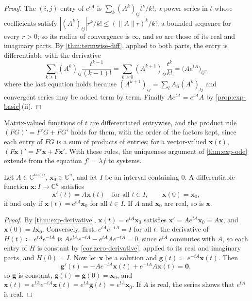 \begin{proof}
The $(i,j)$ entry of $e^{tA}$ is $\sum_k(A^k)_{ij}t^k/k!$, a power series in $t$ whose coefficients satisfy $|(A^k)_{ij}|r^k/k!\le(\|A\|r)^k/k!$, a bounded sequence for every $r>0$; so its radius of convergence is $\infty$, and so are those of its real and imaginary parts. By \cref{thm:termwise-diff}, applied to both parts, the entry is differentiable with the derivative
\[
\sum_{k\ge1}(A^k)_{ij}\frac{t^{k-1}}{(k-1)!}=\sum_{k\ge0}(A^{k+1})_{ij}\frac{t^k}{k!}=\bigl(Ae^{tA}\bigr)_{ij},
\]
where the last equation holds because $(A^{k+1})_{ij}=\sum_lA_{il}(A^k)_{lj}$ and convergent series may be added term by term. Finally $Ae^{tA}=e^{tA}A$ by \cref{prop:exp-basic}\,(ii).
\end{proof}

Matrix-valued functions of $t$ are differentiated entrywise, and the product rule $(FG)'=F'G+FG'$ holds for them, with the order of the factors kept, since each entry of $FG$ is a sum of products of entries; for a vector-valued $\mathbf x(t)$, $(F\mathbf x)'=F'\mathbf x+F\mathbf x'$. With these rules, the uniqueness argument of \cref{thm:exp-ode} extends from the equation $f'=\lambda f$ to systems.

\begin{theorem}
\label{thm:linear-system}
Let $A\in\mathbb C^{n\times n}$, $\mathbf x_0\in\mathbb C^n$, and let $I$ be an interval containing $0$. A differentiable function $\mathbf x\colon I\to\mathbb C^n$ satisfies
\[
\mathbf x'(t)=A\mathbf x(t)\quad\text{for all }t\in I,\qquad\mathbf x(0)=\mathbf x_0 ,
\]
if and only if $\mathbf x(t)=e^{tA}\mathbf x_0$ for all $t\in I$. If $A$ and $\mathbf x_0$ are real, so is $\mathbf x$.
\end{theorem}

\begin{proof}
By \cref{thm:exp-derivative}, $\mathbf x(t)=e^{tA}\mathbf x_0$ satisfies $\mathbf x'=Ae^{tA}\mathbf x_0=A\mathbf x$, and $\mathbf x(0)=I\mathbf x_0$. Conversely, first, $e^{tA}e^{-tA}=I$ for all $t$: the derivative of $H(t)\coloneqq e^{tA}e^{-tA}$ is $Ae^{tA}e^{-tA}-e^{tA}Ae^{-tA}=0$, since $e^{tA}$ commutes with $A$, so each entry of $H$ is constant by \cref{cor:zero-derivative}, applied to its real and imaginary parts, and $H(0)=I$. Now let $\mathbf x$ be a solution and $\mathbf g(t)\coloneqq e^{-tA}\mathbf x(t)$. Then
\[
\mathbf g'(t)=-Ae^{-tA}\mathbf x(t)+e^{-tA}A\mathbf x(t)=\mathbf 0 ,
\]
so $\mathbf g$ is constant, $\mathbf g(t)=\mathbf g(0)=\mathbf x_0$, and $\mathbf x(t)=e^{tA}e^{-tA}\mathbf x(t)=e^{tA}\mathbf g(t)=e^{tA}\mathbf x_0$. If $A$ is real, the series shows that $e^{tA}$ is real.
\end{proof}

